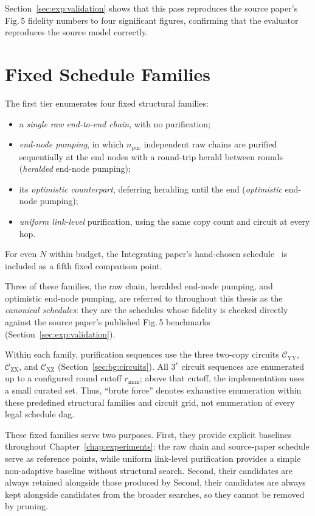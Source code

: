 Section~\ref{sec:exp:validation} shows that this pass reproduces the source paper's Fig.\,5 fidelity numbers to four significant figures, confirming that the evaluator reproduces the source model correctly.

\section{Fixed Schedule Families}
\label{sec:alg:bruteforce}

The first tier enumerates four fixed structural families:
\begin{itemize}
    \item a \emph{single raw end-to-end chain}, with no purification;
    \item \emph{end-node pumping}, in which $n_{\mathrm{pur}}$ independent raw chains are purified sequentially at the end nodes with a round-trip herald between rounds (\emph{heralded} end-node pumping);
    \item its \emph{optimistic counterpart}, deferring heralding until the end (\emph{optimistic} end-node pumping);
    \item \emph{uniform link-level} purification, using the same copy count and circuit at every hop.
\end{itemize}
For even $N$ within budget, the Integrating paper's hand-chosen schedule~\cite{Benchasattabuse2025Integrating} is included as a fifth fixed comparison point.

Three of these families, the raw chain, heralded end-node pumping, and optimistic end-node pumping, are referred to throughout this thesis as the \emph{canonical schedules}: they are the schedules whose fidelity is checked directly against the source paper's published Fig.\,5 benchmarks (Section~\ref{sec:exp:validation}).

Within each family, purification sequences use the three two-copy circuits $\mathcal C_{\mathrm{YY}}$, $\mathcal C_{\mathrm{ZX}}$, and $\mathcal C_{\mathrm{XZ}}$ (Section~\ref{sec:bg:circuits}). All $3^r$ circuit sequences are enumerated up to a configured round cutoff $r_{\max}$; above that cutoff, the implementation uses a small curated set. Thus, ``brute force'' denotes exhaustive enumeration within these predefined structural families and circuit grid, not enumeration of every legal schedule \Gls{dag}.

These fixed families serve two purposes. First, they provide explicit baselines throughout Chapter~\ref{chap:experiments}: the raw chain and source-paper schedule serve as reference points, while uniform link-level purification provides a simple non-adaptive baseline without structural search. Second, their candidates are always retained alongside those produced by Second, their candidates are always kept alongside candidates from the broader searches, so they cannot be removed by pruning.

